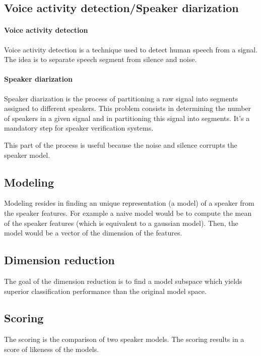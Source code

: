 \documentclass{techrep}
\begin{document}
\subsection{Voice activity detection/Speaker diarization}

\paragraph{Voice activity detection} Voice activity detection is a technique used to detect human speech from a signal.
The idea is to separate speech segment from silence and noise.

\paragraph{Speaker diarization} Speaker diarization is the process of partitioning a raw signal into segments assigned to different speakers. This problem consists in determining the number of speakers in a given signal
and in partitioning this signal into segments. It's a mandatory step for speaker verification systems.

This part of the process is useful because the noise and silence corrupts the speaker model.

\subsection{Modeling}

Modeling resides in finding an unique representation (a model) of a
speaker from the speaker features.  For example a naive model would be
to compute the mean of the speaker features (which is equivalent to a
gaussian model). Then, the model would be a vector of the dimension of
the features.

\subsection{Dimension reduction}

The goal of the dimension reduction is to find a model subspace which yields
superior classification performance than the original model space.

\subsection{Scoring}

The scoring is the comparison of two speaker models. The scoring
results in a score of likeness of the models.
\end{document}
